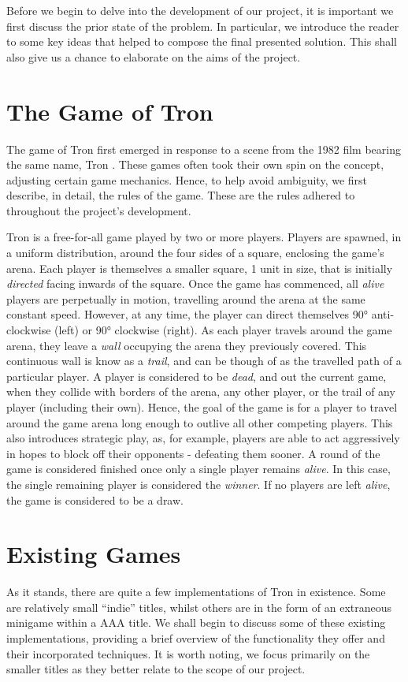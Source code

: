 \documentclass[class=article, crop=false]{standalone}
\begin{document}
	Before we begin to delve into the development of our project, it is important we first discuss the prior state of the problem. In particular, we introduce the reader to some key ideas that helped to compose the final presented solution. This shall also give us a chance to elaborate on the aims of the project.

	\section{The Game of Tron}
		The game of Tron first emerged in response to a scene from the 1982 film bearing the same name, Tron \parencite{TronLightCycleBattle}. These games often took their own spin on the concept, adjusting certain game mechanics. Hence, to help avoid ambiguity, we first describe, in detail, the rules of the game. These are the rules adhered to throughout the project's development.

		Tron is a free-for-all game played by two or more players. Players are spawned, in a uniform distribution, around the four sides of a square, enclosing the game's arena. Each player is themselves a smaller square, 1 unit in size, that is initially \emph{directed} facing inwards of the square. Once the game has commenced, all \emph{alive} players are perpetually in motion, travelling around the arena at the same constant speed. However, at any time, the player can direct themselves 90\si{\degree} anti-clockwise (left) or 90\si{\degree} clockwise (right). As each player travels around the game arena, they leave a \emph{wall} occupying the arena they previously covered. This continuous wall is know as a \emph{trail}, and can be though of as the travelled path of a particular player. A player is considered to be \emph{dead}, and out the current game, when they collide with borders of the arena, any other player, or the trail of any player (including their own). Hence, the goal of the game is for a player to travel around the game arena long enough to outlive all other competing players. This also introduces strategic play, as, for example, players are able to act aggressively in hopes to block off their opponents - defeating them sooner. A round of the game is considered finished once only a single player remains \emph{alive}. In this case, the single remaining player is considered the \emph{winner}. If no players are left \emph{alive}, the game is considered to be a draw.

	\section{Existing Games} \label{sec:existingGames}
		As it stands, there are quite a few implementations of Tron in existence. Some are relatively small \enquote{indie} titles, whilst others are in the form of an extraneous minigame within a AAA title. We shall begin to discuss some of these existing implementations, providing a brief overview of the functionality they offer and their incorporated techniques. It is worth noting, we focus primarily on the smaller titles as they better relate to the scope of our project.
\end{document}
